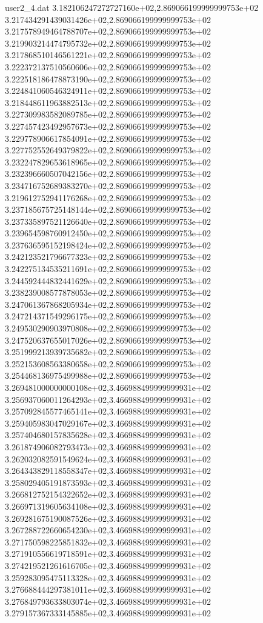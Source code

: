 \begin{filecontents}{user2_4.dat}
3.182106247272727160e+02,2.869066199999999753e+02
3.217434291439031426e+02,2.869066199999999753e+02
3.217578949464788707e+02,2.869066199999999753e+02
3.219903214474795732e+02,2.869066199999999753e+02
3.217868510146561221e+02,2.869066199999999753e+02
3.222372137510560606e+02,2.869066199999999753e+02
3.222518186478873190e+02,2.869066199999999753e+02
3.224841060546324911e+02,2.869066199999999753e+02
3.218448611963882513e+02,2.869066199999999753e+02
3.227309983582089785e+02,2.869066199999999753e+02
3.227457423492957673e+02,2.869066199999999753e+02
3.229778906617854091e+02,2.869066199999999753e+02
3.227752552649379822e+02,2.869066199999999753e+02
3.232247829653618965e+02,2.869066199999999753e+02
3.232396660507042156e+02,2.869066199999999753e+02
3.234716752689383270e+02,2.869066199999999753e+02
3.219612752941176268e+02,2.869066199999999753e+02
3.237185675725148144e+02,2.869066199999999753e+02
3.237335897521126640e+02,2.869066199999999753e+02
3.239654598760912450e+02,2.869066199999999753e+02
3.237636595152198424e+02,2.869066199999999753e+02
3.242123521796677323e+02,2.869066199999999753e+02
3.242275134535211691e+02,2.869066199999999753e+02
3.244592444832441629e+02,2.869066199999999753e+02
3.238239008577878053e+02,2.869066199999999753e+02
3.247061367868205934e+02,2.869066199999999753e+02
3.247214371549296175e+02,2.869066199999999753e+02
3.249530290903970808e+02,2.869066199999999753e+02
3.247520637655017026e+02,2.869066199999999753e+02
3.251999213939735682e+02,2.869066199999999753e+02
3.252153608563380658e+02,2.869066199999999753e+02
3.254468136975499988e+02,2.869066199999999753e+02
3.269481000000000108e+02,3.466988499999999931e+02
3.256937060011264293e+02,3.466988499999999931e+02
3.257092845577465141e+02,3.466988499999999931e+02
3.259405983047029167e+02,3.466988499999999931e+02
3.257404680157835628e+02,3.466988499999999931e+02
3.261874906082793473e+02,3.466988499999999931e+02
3.262032082591549624e+02,3.466988499999999931e+02
3.264343829118558347e+02,3.466988499999999931e+02
3.258029405191873593e+02,3.466988499999999931e+02
3.266812752154322652e+02,3.466988499999999931e+02
3.266971319605634108e+02,3.466988499999999931e+02
3.269281675190087526e+02,3.466988499999999931e+02
3.267288722660654230e+02,3.466988499999999931e+02
3.271750598225851832e+02,3.466988499999999931e+02
3.271910556619718591e+02,3.466988499999999931e+02
3.274219521261616705e+02,3.466988499999999931e+02
3.259283095475113328e+02,3.466988499999999931e+02
3.276688444297381011e+02,3.466988499999999931e+02
3.276849793633803074e+02,3.466988499999999931e+02
3.279157367333145885e+02,3.466988499999999931e+02

\end{filecontents}

